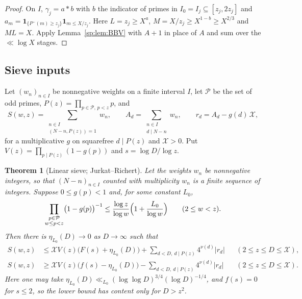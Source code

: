 \documentclass[final,11pt]{elsarticle}
\newtheorem{theorem}{Theorem}[section]
\theoremstyle{definition}
\theoremstyle{remark}
\newcommand{\one}{\mathbf1}
\numberwithin{equation}{section}
\begin{document}
\begin{proof}
On $I$, $\gamma_j=a*b$ with $b$ the indicator of primes in $I_0=I_j\subseteq[z_j,2z_j]$
and $a_m=\one_{\{P^-(m)\ge z_j\}}\one_{m\le X/z_j}$. Here $L=z_j\ge X^a$,
$M=X/z_j\ge X^{1-b}\ge X^{2/3}$ and $ML=X$. Apply Lemma~\ref{sp:lem:BBV} with
$A+1$ in place of $A$ and sum over the $\ll\log X$ stages.
\end{proof}

\subsection{Sieve inputs}\label{sp:sec:sieve}

Let $(w_n)_{n\in I}$ be nonnegative weights on a finite interval $I$, let
$\mathcal P$ be the set of odd primes, $P(z)=\prod_{p\in\mathcal P,\,p<z}p$, and
\[
 S(w,z)=\sum_{\substack{n\in I\\ (N-n,P(z))=1}}w_n,\qquad
 A_d=\sum_{\substack{n\in I\\ d\mid N-n}}w_n,\qquad r_d=A_d-g(d)\,\mathcal X,
\]
for a multiplicative $g$ on squarefree $d\mid P(z)$ and $\mathcal X>0$. Put
$V(z)=\prod_{p\mid P(z)}(1-g(p))$ and $s=\log D/\log z$.

\begin{theorem}[Linear sieve; Jurkat--Richert]\label{sp:thm:sieve}
Let the weights $w_n$ be nonnegative integers, so that $(N-n)_{n\in I}$ counted
with multiplicity $w_n$ is a finite sequence of integers. Suppose
$0\le g(p)<1$ and, for some constant $L_0$,
\begin{equation}\label{sp:eq:dim1}
 \prod_{\substack{p\in\mathcal P\\ w\le p<z}}\bigl(1-g(p)\bigr)^{-1}\le
 \frac{\log z}{\log w}\Bigl(1+\frac{L_0}{\log w}\Bigr)\qquad(2\le w<z).
\end{equation}
Then there is $\eta_{L_0}(D)\to0$ as $D\to\infty$ such that
\begin{align*}
 S(w,z)&\le\mathcal XV(z)\bigl(F(s)+\eta_{L_0}(D)\bigr)
 +\sum_{d<D,\ d\mid P(z)}4^{\nu(d)}|r_d| &&(2\le z\le D\le\mathcal X),\\
 S(w,z)&\ge\mathcal XV(z)\bigl(f(s)-\eta_{L_0}(D)\bigr)
 -\sum_{d<D,\ d\mid P(z)}4^{\nu(d)}|r_d| &&(2\le z\le D\le\mathcal X).
\end{align*}
Here one may take $\eta_{L_0}(D)\ll_{L_0}(\log\log D)^{3/4}(\log D)^{-1/4}$, and
$f(s)=0$ for $s\le2$, so the lower bound has content only for $D>z^2$.
\end{theorem}
\end{document}
